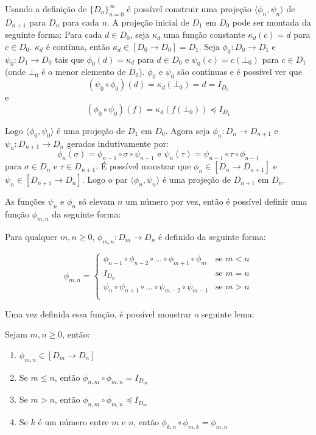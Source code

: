\documentclass[../main.tex]{subfiles}
\begin{document}
Usando a definição de $\{D_n\}^{\infty}_{n=0}$ é possível construir uma projeção $\langle \phi_n, \psi_n \rangle$ de $D_{n+1}$ para $D_n$ para cada $n$. A projeção inicial de $D_1$ em $D_0$ pode ser montada da seguinte forma: Para cada $d \in D_0$, seja $\kappa_d$ uma função constante $\kappa_d (c) = d$ para $c \in D_0$. $\kappa_d$ é contínua, então $\kappa_d \in [D_0 \to D_0] = D_1$. Seja $\phi_0 : D_0 \to D_1$ e $\psi_0 : D_1 \to D_0$ tais que $\phi_0(d) = \kappa_d$ para $d \in D_0$ e $\psi_0 (c) = c(\bot_0)$ para $c \in D_1$ (onde $\bot_0$ é o menor elemento de $D_0$). $\phi_0$ e $\psi_0$ são contínuas e é possível ver que $$(\psi_0 \circ \phi_0) (d) = \kappa_d (\bot_0) = d = I_{D_0}$$ e $$(\phi_0 \circ \psi_0 )(f) = \kappa_d (f (\bot_0)) \preceq I_{D_1}$$

Logo $\langle \phi_0, \psi_0 \rangle$ é uma projeção de $D_1$ em $D_0$. Agora seja $\phi_n : D_n \to D_{n+1}$ e $\psi_n : D_{n+1} \to D_n$ gerados indutivamente por: $$\phi_n(\sigma) = \phi_{n-1} \circ \sigma \circ \psi_{n-1} \text{  e  } \psi_n(\tau) = \psi_{n-1} \circ \tau \circ \phi_{n-1}$$ para $\sigma \in D_n$ e $\tau \in D_{n+1}$. É possível monstrar que $\phi_n \in [D_n \to D_{n+1}]$ e $\psi_n \in [D_{n+1} \to D_n]$. Logo o par $\langle \phi_n, \psi_n \rangle$ é uma projeção de $D_{n+1}$ em $D_n$.

As funções $\psi_n$ e $\phi_n$ só elevam $n$ um número por vez, então é possível definir uma função $\phi_{m,n}$ da seguinte forma:

\begin{definition}
    Para qualquer $m, n \geq 0$, $\phi_{m,n} : D_m \to D_n$ é definido da seguinte forma:

    \begin{equation*}
        \phi_{m,n} =
        \begin{cases}
            \phi_{n - 1} \circ \phi_{n - 2} \circ \dots \circ \phi_{m + 1} \circ \phi_{m} & \text{se } m < n \\
            I_{D_n} & \text{se } m = n \\
            \psi_n \circ \psi_{n+1} \circ \dots \circ \psi_{m - 2} \circ \psi_{m - 1} & \text{se } m > n \\
        \end{cases}
    \end{equation*}
\end{definition}

Uma vez definida essa função, é possível monstrar o seguinte lema:

\begin{lemma}
    Sejam $m, n \geq 0$, então:
    \begin{enumerate}
        \item $\phi_{m,n} \in [D_m \to D_n]$
        \item Se $m \leq n$, então $\phi_{n, m} \circ \phi_{m,n} = I_{D_m}$
        \item Se $m > n$, então $\phi_{n, m} \circ \phi_{m,n} \preceq I_{D_m}$
        \item Se $k$ é um número entre $m$ e $n$, então $\phi_{k, n} \circ \phi_{m,k} = \phi_{m, n}$
    \end{enumerate}
\end{lemma}
\end{document}
